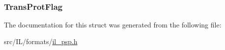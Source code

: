 \hypertarget{struct_l_a_y_e_r_i_n_f_o___c_h_u_n_k_a4779a8da2eddb2f0f745ba4240007832}{
\subsubsection[{Trans\-Prot\-Flag}]{ Trans\-Prot\-Flag}}\label{struct_l_a_y_e_r_i_n_f_o___c_h_u_n_k_a4779a8da2eddb2f0f745ba4240007832}


The documentation for this struct was generated from the following file\-:\begin{DoxyCompactItemize}
\item 
src/\-I\-L/formats/\hyperlink{il__psp_8h}{il\-\_\-psp.\-h}\end{DoxyCompactItemize}
